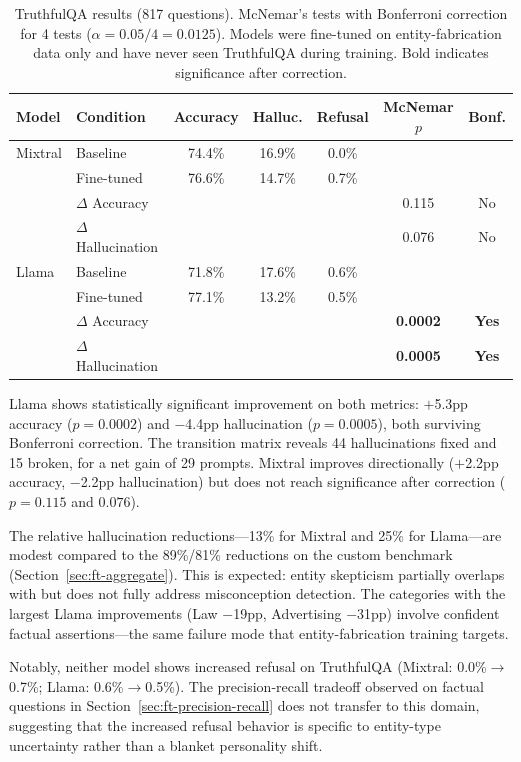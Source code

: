\begin{table}[ht]
\centering
\small
\begin{tabular}{@{}llccccc@{}}
\toprule
\textbf{Model} & \textbf{Condition} & \textbf{Accuracy} & \textbf{Halluc.} & \textbf{Refusal} & \textbf{McNemar $p$} & \textbf{Bonf.} \\
\midrule
Mixtral & Baseline & 74.4\% & 16.9\% & 0.0\% & & \\
        & Fine-tuned & 76.6\% & 14.7\% & 0.7\% & & \\
        & $\Delta$ Accuracy & & & & 0.115 & No \\
        & $\Delta$ Hallucination & & & & 0.076 & No \\
\addlinespace
Llama   & Baseline & 71.8\% & 17.6\% & 0.6\% & & \\
        & Fine-tuned & 77.1\% & 13.2\% & 0.5\% & & \\
        & $\Delta$ Accuracy & & & & \textbf{0.0002} & \textbf{Yes} \\
        & $\Delta$ Hallucination & & & & \textbf{0.0005} & \textbf{Yes} \\
\bottomrule
\end{tabular}
\caption{TruthfulQA results (817 questions). McNemar's tests with Bonferroni correction for 4 tests ($\alpha = 0.05/4 = 0.0125$). Models were fine-tuned on entity-fabrication data only and have never seen TruthfulQA during training. Bold indicates significance after correction.}
\label{tab:truthfulqa}
\end{table}

Llama shows statistically significant improvement on both metrics: $+$5.3pp accuracy ($p = 0.0002$) and $-$4.4pp hallucination ($p = 0.0005$), both surviving Bonferroni correction. The transition matrix reveals 44 hallucinations fixed and 15 broken, for a net gain of 29 prompts. Mixtral improves directionally ($+$2.2pp accuracy, $-$2.2pp hallucination) but does not reach significance after correction ($p = 0.115$ and $0.076$).

The relative hallucination reductions---13\% for Mixtral and 25\% for Llama---are modest compared to the 89\%/81\% reductions on the custom benchmark (Section~\ref{sec:ft-aggregate}). This is expected: entity skepticism partially overlaps with but does not fully address misconception detection. The categories with the largest Llama improvements (Law $-$19pp, Advertising $-$31pp) involve confident factual assertions---the same failure mode that entity-fabrication training targets.

Notably, neither model shows increased refusal on TruthfulQA (Mixtral: 0.0\%$\to$0.7\%; Llama: 0.6\%$\to$0.5\%). The precision-recall tradeoff observed on factual questions in Section~\ref{sec:ft-precision-recall} does not transfer to this domain, suggesting that the increased refusal behavior is specific to entity-type uncertainty rather than a blanket personality shift. 

